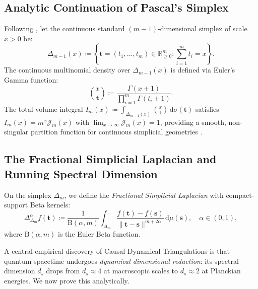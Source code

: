 \documentclass[11pt,a4paper,reqno]{amsart}
\theoremstyle{definition}
\numberwithin{equation}{section}
\newcommand{\R}{\mathbb{R}}
\newcommand{\dif}{\,\mathrm{d}}
\begin{document}
\subsection{Analytic Continuation of Pascal's Simplex}
Following \cite{monarch2026pascal}, let the continuous standard $(m-1)$-dimensional simplex of scale $x > 0$ be:
\begin{equation}
    \label{eq:standard_simplex}
    \Delta_{m-1}(x) \coloneqq \left\{ \mathbf{t} = (t_1, \dots, t_m) \in \R_{\ge 0}^m \colon \sum_{i=1}^m t_i = x \right\}.
\end{equation}
The continuous multinomial density over $\Delta_{m-1}(x)$ is defined via Euler's Gamma function:
\begin{equation}
    \label{eq:continuous_multinomial}
    \binom{x}{\mathbf{t}} \coloneqq \frac{\Gamma(x + 1)}{\prod_{i=1}^m \Gamma(t_i + 1)}.
\end{equation}
The total volume integral $I_m(x) \coloneqq \int_{\Delta_{m-1}(x)} \binom{x}{\mathbf{t}} \dif \sigma(\mathbf{t})$ satisfies $I_m(x) = m^x \mathcal{J}_m(x)$ with $\lim_{x \to \infty} \mathcal{J}_m(x) = 1$, providing a smooth, non-singular partition function for continuous simplicial geometries \cite{monarch2026pascal}.

\subsection{The Fractional Simplicial Laplacian and Running Spectral Dimension}
On the simplex $\Delta_m$, we define the \emph{Fractional Simplicial Laplacian} with compact-support Beta kernels:
\begin{equation}
    \label{eq:frac_simplicial_laplacian}
    \Delta_{\Delta_m}^\alpha f(\mathbf{t}) \coloneqq \frac{1}{\mathrm{B}(\alpha, m)} \int_{\Delta_m} \frac{f(\mathbf{t}) - f(\mathbf{s})}{\|\mathbf{t} - \mathbf{s}\|^{m + 2\alpha}} \dif \mu(\mathbf{s}), \quad \alpha \in (0, 1),
\end{equation}
where $\mathrm{B}(\alpha, m)$ is the Euler Beta function.

A central empirical discovery of Causal Dynamical Triangulations \cite{ambjorn2005spectral} is that quantum spacetime undergoes \emph{dynamical dimensional reduction}: its spectral dimension $d_s$ drops from $d_s \approx 4$ at macroscopic scales to $d_s \approx 2$ at Planckian energies. We now prove this analytically.
\end{document}
